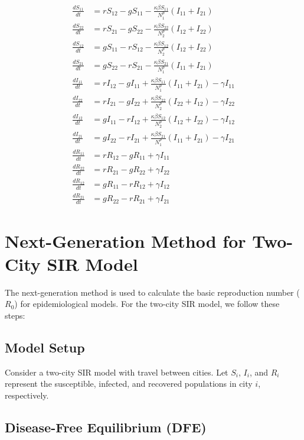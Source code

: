 \documentclass[11pt]{article}
\begin{document}
\begin{align*}
\frac{dS_{11}}{dt} &= rS_{12} - g S_{11} - \frac{\kappa \beta S_{11}}{N_1^p} (I_{11} + I_{21})  \\
\frac{dS_{22}}{dt} &= r S_{21} - g S_{22} - \frac{\kappa \beta S_{22}}{N_2^p} (I_{12} + I_{22}) \\
\frac{dS_{12}}{dt} &= gS_{11}-rS_{12}-\frac{\kappa \beta S_{12}}{N_2^p} (I_{12} + I_{22}) \\
\frac{dS_{21}}{dt} &= gS_{22}-rS_{21}-\frac{\kappa \beta S_{21}}{N_1^p} (I_{11} + I_{21}) \\
\frac{dI_{11}}{dt} &= r I_{12} - g I_{11} + \frac{\kappa \beta S_{11}}{N_1^p} (I_{11} + I_{21}) - \gamma I_{11} \\
\frac{dI_{22}}{dt} &= r I_{21} - g I_{22} + \frac{\kappa \beta S_{22}}{N_2^p} (I_{22} + I_{12}) - \gamma I_{22} \\
\frac{dI_{12}}{dt} &= gI_{11}-rI_{12}+\frac{\kappa \beta S_{12}}{N_2^p} (I_{12} + I_{22}) - \gamma I_{12} \\
\frac{dI_{21}}{dt} &= gI_{22}-rI_{21}+\frac{\kappa \beta S_{21}}{N_1^p} (I_{11} + I_{21}) - \gamma I_{21} \\
\frac{dR_{11}}{dt} &= rR_{12} - gR_{11} + \gamma I_{11} \\
\frac{dR_{22}}{dt} &= rR_{21} - gR_{22} + \gamma I_{22} \\
\frac{dR_{12}}{dt} &= gR_{11} - rR_{12} + \gamma I_{12} \\
\frac{dR_{21}}{dt} &= gR_{22} - rR_{21} + \gamma I_{21}
\end{align*}


\section{Next-Generation Method for Two-City SIR Model}

The next-generation method is used to calculate the basic reproduction number ($R_0$) for epidemiological models. For the two-city SIR model, we follow these steps:

\subsection{Model Setup}

Consider a two-city SIR model with travel between cities. Let $S_i$, $I_i$, and $R_i$ represent the susceptible, infected, and recovered populations in city $i$, respectively.

\subsection{Disease-Free Equilibrium (DFE)}
\end{document}
